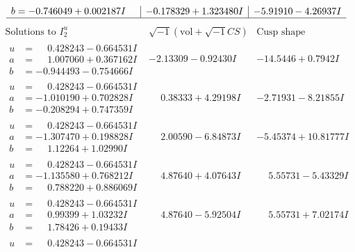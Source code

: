 \documentclass[1p]{elsarticle_modified}
\theoremstyle{definition}
\newcommand{\I}{\sqrt{-1}}
\begin{document}
$$\begin{array}{c|c|c}
\begin{aligned}
b &= -0.746049 + 0.002187 I\end{aligned}
 & -0.178329 + 1.323480 I & -5.91910 - 4.26937 I\\
 \hline 
 \end{array}$$\newpage$$\begin{array}{c|c|c}  
\text{Solutions to }I^u_{2}& \I (\text{vol} + \sqrt{-1}CS) & \text{Cusp shape}\\
 \hline 
\begin{aligned}
u &= \phantom{-}0.428243 - 0.664531 I \\
a &= \phantom{-}1.007060 + 0.367162 I \\
b &= -0.944493 - 0.754666 I\end{aligned}
 & -2.13309 - 0.92430 I & -14.5446 + 0.7942 I \\ \hline\begin{aligned}
u &= \phantom{-}0.428243 - 0.664531 I \\
a &= -1.010190 + 0.702828 I \\
b &= -0.208294 + 0.747359 I\end{aligned}
 & \phantom{-}0.38333 + 4.29198 I & -2.71931 - 8.21855 I \\ \hline\begin{aligned}
u &= \phantom{-}0.428243 - 0.664531 I \\
a &= -1.307470 + 0.198828 I \\
b &= \phantom{-}1.12264 + 1.02990 I\end{aligned}
 & \phantom{-}2.00590 - 6.84873 I & -5.45374 + 10.81777 I \\ \hline\begin{aligned}
u &= \phantom{-}0.428243 - 0.664531 I \\
a &= -1.135580 + 0.768212 I \\
b &= \phantom{-}0.788220 + 0.886069 I\end{aligned}
 & \phantom{-}4.87640 + 4.07643 I & \phantom{-}5.55731 - 5.43329 I \\ \hline\begin{aligned}
u &= \phantom{-}0.428243 - 0.664531 I \\
a &= \phantom{-}0.99399 + 1.03232 I \\
b &= \phantom{-}1.78426 + 0.19433 I\end{aligned}
 & \phantom{-}4.87640 - 5.92504 I & \phantom{-}5.55731 + 7.02174 I \\ \hline\begin{aligned}
u &= \phantom{-}0.428243 - 0.664531 I \\

\end{aligned}
\end{array}$$
\end{document}
